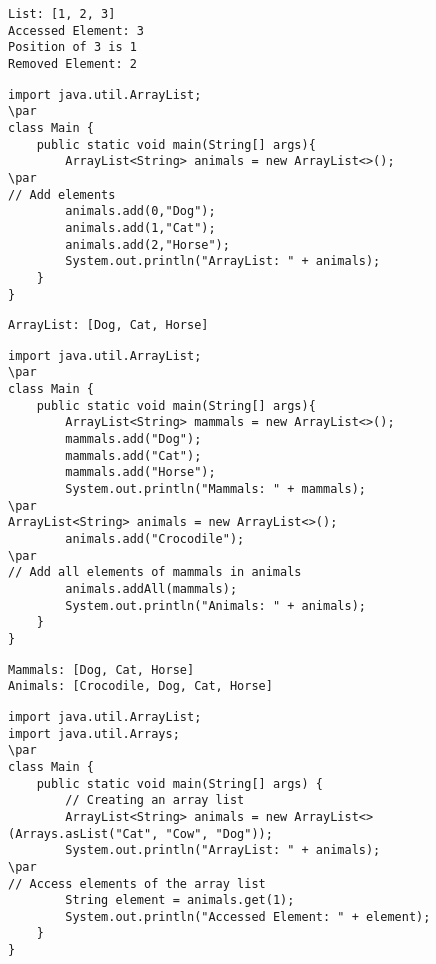 \documentclass{book}
\def\lthtmlcheckvsize{\ifdim\ht\sizebox<\vsize 
  \ifdim\wd\sizebox<\hsize\expandafter\hfill\fi \expandafter\vfill
  \else\expandafter\vss\fi}%
\begin{document}
{\newpage\clearpage
{}%
\begin{lstlisting}
List: [1, 2, 3]
Accessed Element: 3
Position of 3 is 1
Removed Element: 2
\end{lstlisting}%
\lthtmlfigureZ
\lthtmlcheckvsize\clearpage}

{\newpage\clearpage
{}%
\begin{lstlisting}
import java.util.ArrayList;
\par
class Main {
    public static void main(String[] args){
        ArrayList<String> animals = new ArrayList<>();
\par
// Add elements
        animals.add(0,"Dog");
        animals.add(1,"Cat");
        animals.add(2,"Horse");
        System.out.println("ArrayList: " + animals);
    }
}
\end{lstlisting}%
\lthtmlfigureZ
\lthtmlcheckvsize\clearpage}

{\newpage\clearpage
{}%
\begin{lstlisting}
ArrayList: [Dog, Cat, Horse]
\end{lstlisting}%
\lthtmlfigureZ
\lthtmlcheckvsize\clearpage}

{\newpage\clearpage
{}%
\begin{lstlisting}
import java.util.ArrayList;
\par
class Main {
    public static void main(String[] args){
        ArrayList<String> mammals = new ArrayList<>();
        mammals.add("Dog");
        mammals.add("Cat");
        mammals.add("Horse");
        System.out.println("Mammals: " + mammals);
\par
ArrayList<String> animals = new ArrayList<>();
        animals.add("Crocodile");
\par
// Add all elements of mammals in animals
        animals.addAll(mammals);
        System.out.println("Animals: " + animals);
    }
}
\end{lstlisting}%
\lthtmlfigureZ
\lthtmlcheckvsize\clearpage}

{\newpage\clearpage
{}%
\begin{lstlisting}
Mammals: [Dog, Cat, Horse]
Animals: [Crocodile, Dog, Cat, Horse]
\end{lstlisting}%
\lthtmlfigureZ
\lthtmlcheckvsize\clearpage}

{\newpage\clearpage
{}%
\begin{lstlisting}
import java.util.ArrayList;
import java.util.Arrays;
\par
class Main {
    public static void main(String[] args) {
        // Creating an array list
        ArrayList<String> animals = new ArrayList<>(Arrays.asList("Cat", "Cow", "Dog"));
        System.out.println("ArrayList: " + animals);
\par
// Access elements of the array list
        String element = animals.get(1);
        System.out.println("Accessed Element: " + element);
    }
}
\end{lstlisting}%
\lthtmlfigureZ
\lthtmlcheckvsize\clearpage}
\end{document}
